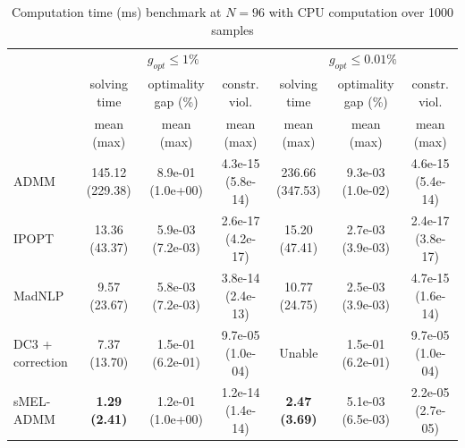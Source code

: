 \begin{table}[t]
\centering
\caption{Computation time (ms) benchmark at $N = 96$ with CPU computation over 1000 samples}
\label{tab:power_grid_N96}
\begin{tabular}{lcccccc}
\hline
 & \multicolumn{3}{c}{$g_{opt} \leq 1\%$} & \multicolumn{3}{c}{$g_{opt} \leq 0.01\%$} \\
 & solving time & optimality gap (\%) & constr. viol. & solving time & optimality gap (\%) & constr. viol. \\
 & mean (max) & mean (max) & mean (max) & mean (max) & mean (max) & mean (max) \\
\hline
ADMM & 145.12 (229.38) & 8.9e-01 (1.0e+00) & 4.3e-15 (5.8e-14) & 236.66 (347.53) & 9.3e-03 (1.0e-02) & 4.6e-15 (5.4e-14) \\
IPOPT & 13.36 (43.37) & 5.9e-03 (7.2e-03) & 2.6e-17 (4.2e-17) & 15.20 (47.41) & 2.7e-03 (3.9e-03) & 2.4e-17 (3.8e-17) \\
MadNLP & 9.57 (23.67) & 5.8e-03 (7.2e-03) & 3.8e-14 (2.4e-13) & 10.77 (24.75) & 2.5e-03 (3.9e-03) & 4.7e-15 (1.6e-14) \\
DC3 + correction & 7.37 (13.70) & 1.5e-01 (6.2e-01) & 9.7e-05 (1.0e-04) & Unable & 1.5e-01 (6.2e-01) & 9.7e-05 (1.0e-04) \\
sMEL-ADMM & \textbf{1.29 (2.41)} & 1.2e-01 (1.0e+00) & 1.2e-14 (1.4e-14) & \textbf{2.47 (3.69)} & 5.1e-03 (6.5e-03) & 2.2e-05 (2.7e-05) \\
\hline
\end{tabular}
\end{table}
